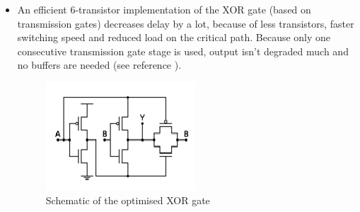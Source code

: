 \documentclass[english]{article}
\begin{document}
\begin{enumerate}
\begin{itemize}
\begin{enumerate}
\item DotOperatorNormalIn ('DON')
\item DotOperatorInvertedIn ('DOI')
\item DotOperatorSimpleNormalIn ('DOSN')
\item DotOperatorSimpleInvertedIn ('DOSI')
\item DotOperatorSimpleNormalHighInvertedLow ('DOSNHIL')
\item DotOperatorSimpleInvertedHighNormalLow ('DOSIHNL')
\end{enumerate}
See section \ref{subsec:Schematics} and  the structural schematic (Figure \ref{adderSchematic}). \par
Some of the paths require an inverter before the XOR sum-generation. These paths therefore have longer delay. We can reduce this imbalance by scaling the invertor/XOR gates (see Sizing).

\item An efficient 6-transistor implementation of the XOR gate (based on transmission gates) decreases delay by a lot, because of less transistors, faster switching speed and reduced load on the critical path. Because only one consecutive transmission gate stage is used, output isn't degraded much and no buffers are needed (see reference \cite{website:xorTransmissionGate}).

\begin{figure}[H]
\begin{centering}
\includegraphics{figures/efficientXOR.png}
\par\end{centering}
\caption{Schematic of the optimised XOR gate}
\label{adderSchematic}
\end{figure}


\end{itemize}
\end{enumerate}
\end{document}
